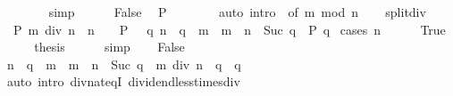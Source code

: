 \begin{isabellebody}
\ \ \ \ \ \ \isamarkupfalse%
\ simp\isanewline
\ \ \ \ \isamarkupfalse%
\ False\ \isamarkupfalse%
\ {\isacharquery}{\kern0pt}P\isanewline
\ \ \ \ \ \ \isamarkupfalse%
\ {\isacharparenleft}{\kern0pt}auto\ intro{\isacharcolon}{\kern0pt}\ {\isacharasterisk}{\kern0pt}\ {\isacharbrackleft}{\kern0pt}of\ {\isachardoublequoteopen}m\ mod\ n{\isachardoublequoteclose}{\isacharbrackright}{\kern0pt}{\isacharparenright}{\kern0pt}\isanewline
\ \ \isamarkupfalse%
\isanewline
{}\isamarkupfalse%
%
\endisatagproof
{\isafoldproof}%
%
\isadelimproof
\isanewline
%
\endisadelimproof
\isanewline
{}\isamarkupfalse%
\ split{\isacharunderscore}{\kern0pt}div{\isacharprime}{\kern0pt}{\isacharcolon}{\kern0pt}\isanewline
\ \ {\isachardoublequoteopen}P\ {\isacharparenleft}{\kern0pt}m\ div\ n{\isacharparenright}{\kern0pt}\ {\isasymlongleftrightarrow}\ n\ {\isacharequal}{\kern0pt}\ {}\ {\isasymand}\ P\ {}\ {\isasymor}\ {\isacharparenleft}{\kern0pt}{\isasymexists}q{\isachardot}{\kern0pt}\ {\isacharparenleft}{\kern0pt}n\ {\isacharasterisk}{\kern0pt}\ q\ {\isasymle}\ m\ {\isasymand}\ m\ {\isacharless}{\kern0pt}\ n\ {\isacharasterisk}{\kern0pt}\ Suc\ q{\isacharparenright}{\kern0pt}\ {\isasymand}\ P\ q{\isacharparenright}{\kern0pt}{\isachardoublequoteclose}\isanewline
%
\isadelimproof
%
\endisadelimproof
%
\isatagproof
{}\isamarkupfalse%
\ {\isacharparenleft}{\kern0pt}cases\ {\isachardoublequoteopen}n\ {\isacharequal}{\kern0pt}\ {}{\isachardoublequoteclose}{\isacharparenright}{\kern0pt}\isanewline
\ \ \isamarkupfalse%
\ True\isanewline
\ \ \isamarkupfalse%
\ \isamarkupfalse%
\ {\isacharquery}{\kern0pt}thesis\isanewline
\ \ \ \ \isamarkupfalse%
\ simp\isanewline
{}\isamarkupfalse%
\isanewline
\ \ \isamarkupfalse%
\ False\isanewline
\ \ \isamarkupfalse%
\ \isamarkupfalse%
\ {\isachardoublequoteopen}n\ {\isacharasterisk}{\kern0pt}\ q\ {\isasymle}\ m\ {\isasymand}\ m\ {\isacharless}{\kern0pt}\ n\ {\isacharasterisk}{\kern0pt}\ Suc\ q\ {\isasymlongleftrightarrow}\ m\ div\ n\ {\isacharequal}{\kern0pt}\ q{\isachardoublequoteclose}\ \ q\isanewline
\ \ \ \ \isamarkupfalse%
\ {\isacharparenleft}{\kern0pt}auto\ intro{\isacharcolon}{\kern0pt}\ div{\isacharunderscore}{\kern0pt}nat{\isacharunderscore}{\kern0pt}eqI\ dividend{\isacharunderscore}{\kern0pt}less{\isacharunderscore}{\kern0pt}times{\isacharunderscore}{\kern0pt}div{\isacharparenright}{\kern0pt}\isanewline

\end{isabellebody}
